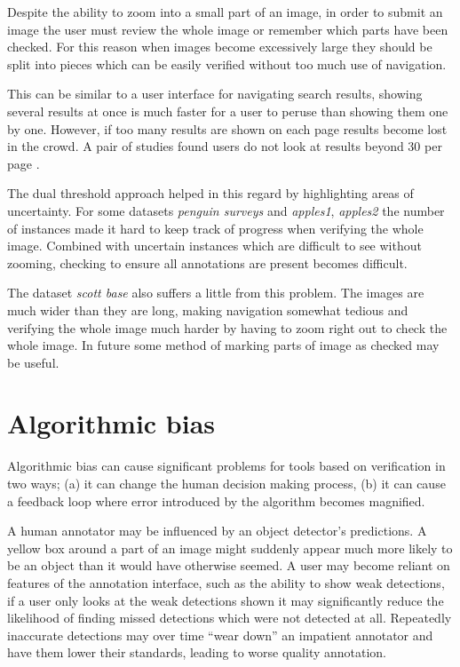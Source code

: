 Despite the ability to zoom into a small part of an image, in order to submit an image the user must review the whole image or remember which parts have been checked. For this reason when images become excessively large they should be split into pieces which can be easily verified without too much use of navigation.

This can be similar to a user interface for navigating search results, showing several results at once is much faster for a user to peruse than showing them one by one. However, if too many results are shown on each page results become lost in the crowd. A pair of studies found users do not look at results beyond 30 per page \cite{PunchoojitLumpapun2017, Zhou2007}.

The dual threshold approach helped in this regard by highlighting areas of uncertainty. For some datasets \emph{penguin surveys} and \emph{apples1}, \emph{apples2} the number of instances made it hard to keep track of progress when verifying the whole image. Combined with uncertain instances which are difficult to see without zooming, checking to ensure all annotations are present becomes difficult.

The dataset \emph{scott base} also suffers a little from this problem. The images are much wider than they are long, making navigation somewhat tedious and verifying the whole image much harder by having to zoom right out to check the whole image. In future some method of marking parts of image as checked may be useful.

\section{Algorithmic bias}
\label{sec:machine_bias}

Algorithmic bias can cause significant problems for tools based on verification in two ways; (a) it can change the human decision making process, (b) it can cause a feedback loop where error introduced by the algorithm becomes magnified.

A human annotator may be influenced by an object detector's predictions. A yellow box around a part of an image might suddenly appear much more likely to be an object than it would have otherwise seemed. A user may become reliant on features of the annotation interface, such as the ability to show weak detections, if a user only looks at the weak detections shown it may significantly reduce the likelihood of finding missed detections which were not detected at all. Repeatedly inaccurate detections may over time ``wear down'' an impatient annotator and have them lower their standards, leading to worse quality annotation. 


